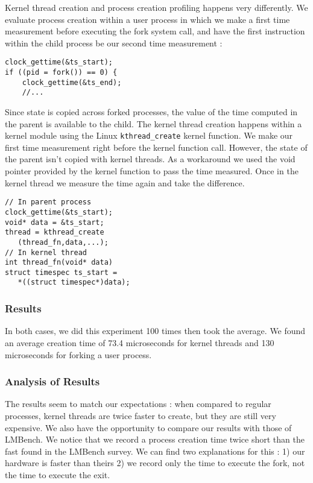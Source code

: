 Kernel thread creation and process creation profiling happens very differently. We evaluate process creation
within a user process in which we make a first time measurement before executing the fork system call, and 
have the first instruction within the child process be our second time measurement :

\begin{lstlisting}
clock_gettime(&ts_start);	
if ((pid = fork()) == 0) {
	clock_gettime(&ts_end);
	//...
\end{lstlisting}

Since state is copied across forked processes, the value of the time computed in the parent is available to the 
child. The kernel thread creation happens within a kernel module using the Linux \texttt{kthread\_create} kernel
function. We make our first time measurement right before the kernel function call. However, the state of the parent isn't copied with kernel threads. As a workaround we used the void pointer provided by the kernel function to pass the time measured.
Once in the kernel thread we measure the time again and take the difference.

\begin{lstlisting}
// In parent process
clock_gettime(&ts_start);	
void* data = &ts_start;
thread = kthread_create
   (thread_fn,data,...);
// In kernel thread
int thread_fn(void* data)
struct timespec ts_start =
   *((struct timespec*)data);
\end{lstlisting}

\subsubsection{Results}

In both cases, we did this experiment 100 times then took the average. We found an average creation time of  73.4 microseconds for kernel threads and 130 microseconds for forking a user process.

\subsubsection{Analysis of Results}

The results seem to match our expectations : when compared to regular processes, kernel threads are twice faster to create, but they are still very expensive. We also have the opportunity to compare our results with those of LMBench. We notice that we record a process creation time twice short than the fast found in the LMBench survey. We can find two explanations for this : 1) our hardware is faster than theirs 2) we record only the time to execute the fork, not the time to execute the exit.

